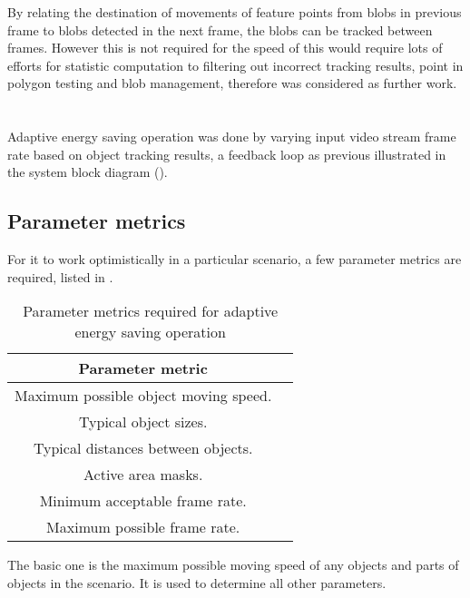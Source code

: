 By relating the destination of movements of feature points from blobs in previous frame to blobs detected in the next frame, the blobs can be tracked between frames. However this is not required for  the  speed of  this would  require lots of efforts for statistic computation to filtering out incorrect tracking results, point in polygon testing  and blob management, therefore was considered as further work.

\section{}

Adaptive energy saving operation was done by varying input video stream frame rate based on object tracking results, a feedback loop as previous illustrated in the system block diagram ().

\subsection{Parameter metrics}
\label{imp:ada:metric}

For it to work optimistically in a particular scenario, a few parameter metrics are required, listed in .

\begin{table}[H]
  \centering
  \begin{tabular}{cc}
  \toprule
  \textbf{Parameter metric} \\
  \midrule
  Maximum possible object moving speed. \\
  Typical object sizes. \\
  Typical distances between objects. \\
  Active area masks. \\
  Minimum acceptable frame rate. \\
  Maximum possible frame rate. \\
  \bottomrule
  \end{tabular}
  \caption{Parameter metrics required for adaptive energy saving operation}
  \label{imp:ada:par}
\end{table}

The basic one is the maximum possible moving speed of any objects and parts of objects in the scenario. It is used to determine all other parameters.


